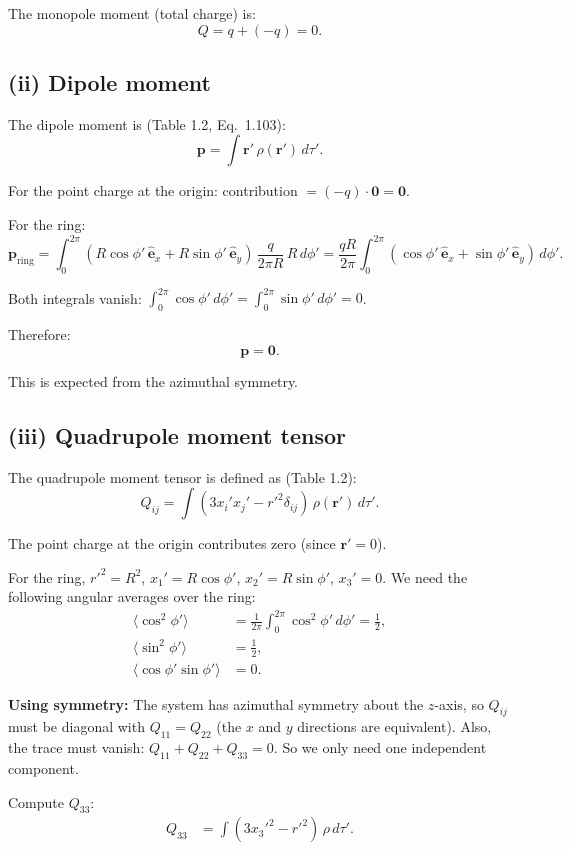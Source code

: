 \documentclass[12pt]{article}
\newcommand{\vect}[1]{\mathbf{#1}}
\newcommand{\ehat}[1]{\hat{\vect{e}}_{#1}}
\begin{document}
The monopole moment (total charge) is:
\[
Q = q + (-q) = \boxed{0}.
\]

\subsection*{(ii) Dipole moment}

The dipole moment is (Table 1.2, Eq.~1.103):
\[
\vect{p} = \int \vect{r}'\,\rho(\vect{r}')\,d\tau'.
\]

For the point charge at the origin: contribution $= (-q)\cdot\vect{0} = \vect{0}$.

For the ring:
\[
\vect{p}_{\text{ring}} = \int_0^{2\pi} (R\cos\phi'\,\ehat{x} + R\sin\phi'\,\ehat{y})\,\frac{q}{2\pi R}\,R\,d\phi' = \frac{qR}{2\pi}\int_0^{2\pi}(\cos\phi'\,\ehat{x} + \sin\phi'\,\ehat{y})\,d\phi'.
\]

Both integrals vanish: $\int_0^{2\pi}\cos\phi'\,d\phi' = \int_0^{2\pi}\sin\phi'\,d\phi' = 0$.

Therefore:
\[
\boxed{\vect{p} = \vect{0}}.
\]

This is expected from the azimuthal symmetry.

\subsection*{(iii) Quadrupole moment tensor}

The quadrupole moment tensor is defined as (Table 1.2):
\[
Q_{ij} = \int (3x_i'x_j' - r'^2\delta_{ij})\,\rho(\vect{r}')\,d\tau'.
\]

The point charge at the origin contributes zero (since $\vect{r}' = 0$).

For the ring, $r'^2 = R^2$, $x_1' = R\cos\phi'$, $x_2' = R\sin\phi'$, $x_3' = 0$. We need the following angular averages over the ring:
\begin{align}
\langle\cos^2\phi'\rangle &= \frac{1}{2\pi}\int_0^{2\pi}\cos^2\phi'\,d\phi' = \frac{1}{2}, \\
\langle\sin^2\phi'\rangle &= \frac{1}{2}, \\
\langle\cos\phi'\sin\phi'\rangle &= 0.
\end{align}

\textbf{Using symmetry:} The system has azimuthal symmetry about the $z$-axis, so $Q_{ij}$ must be diagonal with $Q_{11} = Q_{22}$ (the $x$ and $y$ directions are equivalent). Also, the trace must vanish: $Q_{11} + Q_{22} + Q_{33} = 0$. So we only need one independent component.

Compute $Q_{33}$:
\begin{align}
Q_{33} &= \int (3x_3'^2 - r'^2)\,\rho\,d\tau'.
\end{align}
\end{document}
